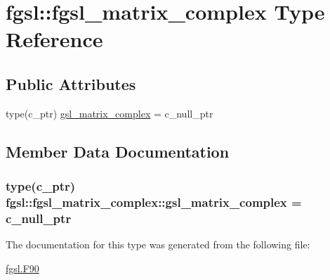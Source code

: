 \hypertarget{structfgsl_1_1fgsl__matrix__complex}{\section{fgsl\-:\-:fgsl\-\_\-matrix\-\_\-complex Type Reference}
\label{structfgsl_1_1fgsl__matrix__complex}
}
\subsection*{Public Attributes}
\begin{DoxyCompactItemize}
\item 
type(c\-\_\-ptr) \hyperlink{structfgsl_1_1fgsl__matrix__complex_a81cb20350441aba8adeb1e51dbb1e53c}{gsl\-\_\-matrix\-\_\-complex} = c\-\_\-null\-\_\-ptr
\end{DoxyCompactItemize}


\subsection{Member Data Documentation}
\hypertarget{structfgsl_1_1fgsl__matrix__complex_a81cb20350441aba8adeb1e51dbb1e53c}{
\subsubsection[{gsl\-\_\-matrix\-\_\-complex}]{\setlength{\rightskip}{0pt plus 5cm}type(c\-\_\-ptr) fgsl\-::fgsl\-\_\-matrix\-\_\-complex\-::gsl\-\_\-matrix\-\_\-complex = c\-\_\-null\-\_\-ptr}}\label{structfgsl_1_1fgsl__matrix__complex_a81cb20350441aba8adeb1e51dbb1e53c}


The documentation for this type was generated from the following file\-:\begin{DoxyCompactItemize}
\item 
\hyperlink{fgsl_8F90}{fgsl.\-F90}\end{DoxyCompactItemize}
